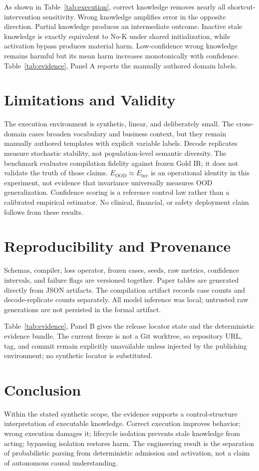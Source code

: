 \documentclass[10pt,twocolumn]{article}
\begin{document}
As shown in Table~\ref{tab:execution}, correct knowledge removes nearly all shortcut-intervention sensitivity. Wrong knowledge amplifies error in the opposite direction. Partial knowledge produces an intermediate outcome. Inactive stale knowledge is exactly equivalent to No-K under shared initialization, while activation bypass produces material harm. Low-confidence wrong knowledge remains harmful but its mean harm increases monotonically with confidence. Table~\ref{tab:evidence}, Panel A reports the manually authored domain labels.

\section{Limitations and Validity}
The execution environment is synthetic, linear, and deliberately small. The cross-domain cases broaden vocabulary and business context, but they remain manually authored templates with explicit variable labels. Decode replicates measure stochastic stability, not population-level semantic diversity. The benchmark evaluates compilation fidelity against frozen Gold IR; it does not validate the truth of those claims. $E_{\mathrm{OOD}}\approx E_{\mathrm{inv}}$ is an operational identity in this experiment, not evidence that invariance universally measures OOD generalization. Confidence scoring is a reference control law rather than a calibrated empirical estimator. No clinical, financial, or safety deployment claim follows from these results.

\section{Reproducibility and Provenance}
Schemas, compiler, loss operator, frozen cases, seeds, raw metrics, confidence intervals, and failure flags are versioned together. Paper tables are generated directly from JSON artifacts. The compilation artifact records case counts and decode-replicate counts separately. All model inference was local; untrusted raw generations are not persisted in the formal artifact.

Table~\ref{tab:evidence}, Panel B gives the release locator state and the deterministic evidence bundle. The current freeze is not a Git worktree, so repository URL, tag, and commit remain explicitly unavailable unless injected by the publishing environment; no synthetic locator is substituted.

\section{Conclusion}
Within the stated synthetic scope, the evidence supports a control-structure interpretation of executable knowledge. Correct execution improves behavior; wrong execution damages it; lifecycle isolation prevents stale knowledge from acting; bypassing isolation restores harm. The engineering result is the separation of probabilistic parsing from deterministic admission and activation, not a claim of autonomous causal understanding.
\end{document}

